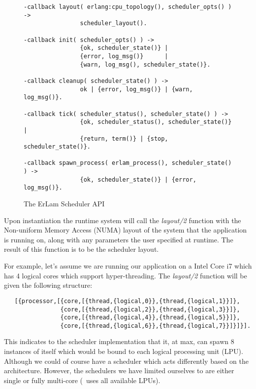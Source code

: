 \begin{figure}
    \begin{verbatim}
-callback layout( erlang:cpu_topology(), scheduler_opts() ) -> 
                scheduler_layout().

-callback init( scheduler_opts() ) -> 
                {ok, scheduler_state()} |
                {error, log_msg()}      |
                {warn, log_msg(), scheduler_state()}.

-callback cleanup( scheduler_state() ) -> 
                ok | {error, log_msg()} | {warn, log_msg()}.

-callback tick( scheduler_status(), scheduler_state() ) -> 
                {ok, scheduler_status(), scheduler_state()} |
                {return, term()} | {stop, scheduler_state()}. 

-callback spawn_process( erlam_process(), scheduler_state() ) -> 
                {ok, scheduler_state()} | {error, log_msg()}.
\end{verbatim}
\caption{The ErLam Scheduler API}
\label{fig:scheduler-api}
\end{figure}

Upon instantiation the runtime system will call the 
\emph{layout/2} function with the Non-uniform Memory Access (NUMA) layout 
of the system that the application is
running on, along with any parameters the user specified at runtime. The 
result of this function is to be the scheduler layout. 

For example, let's assume we are running our application on a Intel Core i7 
which has 4 logical cores which support hyper-threading. The \emph{layout/2}
function will be given the following structure: 

{\footnotesize 
\begin{verbatim}
   [{processor,[{core,[{thread,{logical,0}},{thread,{logical,1}}]},
                {core,[{thread,{logical,2}},{thread,{logical,3}}]},
                {core,[{thread,{logical,4}},{thread,{logical,5}}]},
                {core,[{thread,{logical,6}},{thread,{logical,7}}]}]}].
\end{verbatim}
} 

\noindent
This indicates to the scheduler implementation that it, at max, can spawn $8$
instances of itself which would be bound to each logical processing unit (LPU).
Although we could of course have a scheduler which acts differently based on the
architecture. However, the schedulers we have limited ourselves to are either
single or fully multi-core (\ie~uses all available LPUs).

